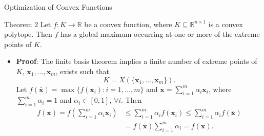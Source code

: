 \documentclass[aspectratio=169,hyperref,UTF8,CJK]{beamer}
\newcommand{\R}{\mathbb{R}}
\newcommand{\vect}[1]{\boldsymbol{#1}}
\begin{document}
\begin{frame}{Optimization of Convex Functions}
  \scriptsize
  \begin{block}{Theorem 2}
    Let $f:K\to\R$ be a convex function, where $K\subseteq\R^{n\times1}$ is a convex polytope. Then $f$ has a global maximum occurring at one or more of the extreme points of $K$.
  \end{block}
  \begin{itemize}
    \item \textbf{Proof}: The finite basis theorem implies a finite number of extreme points of $K$, $\vect{x}_1,\ldots,\vect{x}_m$, exists such that
      \begin{equation*}
        K=X(\{\vect{x}_1,\ldots,\vect{x}_m\}).
      \end{equation*}
      Let $f(\bar{\vect{x}})=\max\{f(\vect{x}_i):i=1,\ldots,m\}$ and
      $\vect{x}=\sum_{i=1}^{m}\alpha_i\vect{x}_i$, where
      $\sum_{i=1}^{m}\alpha_i=1$ and $\alpha_i\in[0,1]$, $\forall i$. Then
      \begin{align*}
        f(\vect{x})=f\left(\sum_{i=1}^{m}\alpha_i\vect{x}_i\right)
        &\le\sum_{i=1}^{m}\alpha_i f(\vect{x}_i)
        \le\sum_{i=1}^{m}\alpha_i f(\bar{\vect{x}})\\
        &=f(\bar{\vect{x}})\sum_{i=1}^{m}\alpha_i=f(\bar{\vect{x}}).
      \end{align*}
  \end{itemize}
\end{frame}
\end{document}
